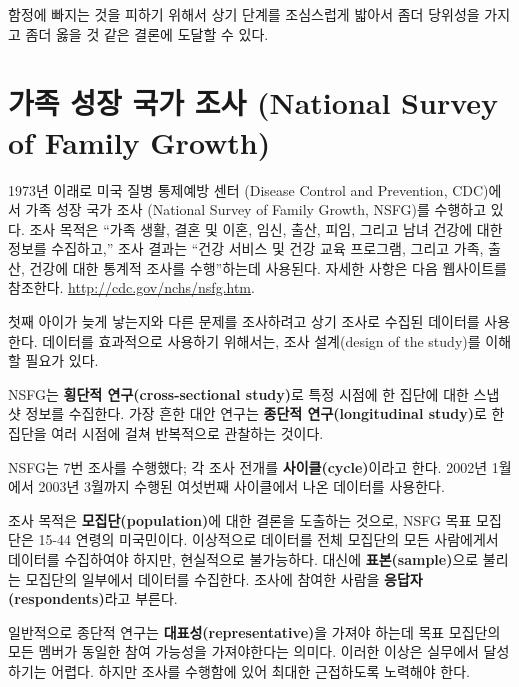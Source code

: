 함정에 빠지는 것을 피하기 위해서 상기 단계를 조심스럽게 밟아서 좀더 당위성을 가지고 좀더 옳을 것 같은 결론에 도달할 수 있다.


\section{가족 성장 국가 조사 (National Survey of Family Growth)}
\label{nsfg}

1973년 이래로 미국 질병 통제예방 센터 (Disease Control and Prevention, CDC)에서 
가족 성장 국가 조사 (National Survey of Family Growth, NSFG)를 수행하고 있다.
조사 목적은 ``가족 생활, 결혼 및 이혼, 임신, 출산, 피임, 그리고 남녀 건강에 대한 정보를 수집하고,''
조사 결과는 ``건강 서비스 및 건강 교육 프로그램, 그리고 가족, 출산, 건강에 대한 통계적 조사를 수행''하는데 사용된다.
자세한 사항은 다음 웹사이트를 참조한다. \url{http://cdc.gov/nchs/nsfg.htm}.

첫째 아이가 늦게 낳는지와 다른 문제를 조사하려고 상기 조사로 수집된 데이터를 사용한다.
데이터를 효과적으로 사용하기 위해서는, 조사 설계(design of the study)를 이해할 필요가 있다.

NSFG는 {\bf 횡단적 연구(cross-sectional study)}로 특정 시점에 한 집단에 대한 스냅샷 정보를 수집한다.
가장 흔한 대안 연구는 {\bf 종단적 연구(longitudinal study)}로 한 집단을 여러 시점에 걸쳐 반복적으로 관찰하는 것이다. 


NSFG는 7번 조사를 수행했다; 각 조사 전개를 {\bf 사이클(cycle)}이라고 한다. 
2002년 1월에서 2003년 3월까지 수행된 여섯번째 사이클에서 나온 데이터를 사용한다.  


조사 목적은 {\bf 모집단(population)}에 대한 결론을 도출하는 것으로, NSFG 목표 모집단은 15-44 연령의 미국민이다.
이상적으로 데이터를 전체 모집단의 모든 사람에게서 데이터를 수집하여야 하지만, 현실적으로 불가능하다.
대신에 {\bf 표본(sample)}으로 불리는 모집단의 일부에서 데이터를 수집한다.
조사에 참여한 사람을 {\bf 응답자(respondents)}라고 부른다.


일반적으로 종단적 연구는 {\bf 대표성(representative)}을 가져야 하는데 목표 모집단의 모든 멤버가 동일한 참여 가능성을 가져야한다는 의미다. 이러한 이상은 실무에서 달성하기는 어렵다. 하지만 조사를 수행함에 있어 최대한 근접하도록 노력해야 한다.

